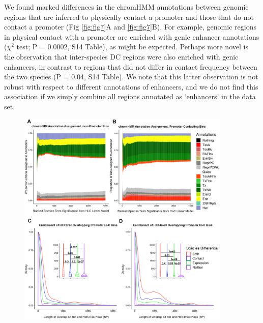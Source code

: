 We found marked differences in the chromHMM annotations between genomic regions that are inferred to physically contact a promoter and those that do not contact a promoter (Fig \ref{fig:fig7}A and \ref{fig:fig7}B). For example, genomic regions in physical contact with a promoter are enriched with genic enhancer annotations ($\chi^2$ test; P = 0.0002, S14 Table), as might be expected. Perhaps more novel is the observation that inter-species DC regions were also enriched with genic enhancers, in contrast to regions that did not differ in contact frequency between the two species (P = 0.04, S14 Table). We note that this latter observation is not robust with respect to different annotations of enhancers, and we do not find this association if we simply combine all regions annotated as `enhancers' in the data set.

\begin{figure}
\centering
\includegraphics[width=4in]{img/fig7.PNG}

\end{figure}
